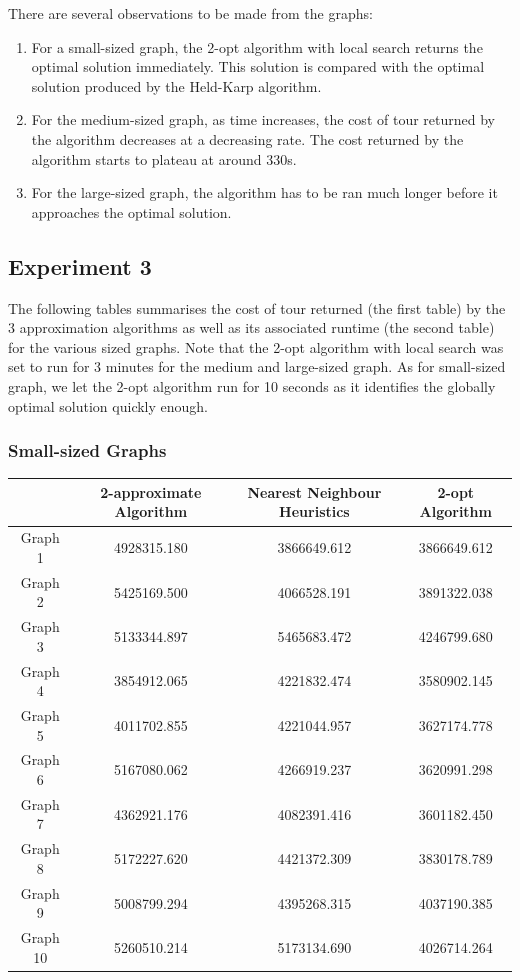\documentclass[paper=a4, fontsize=11pt]{scrartcl}	%
\numberwithin{equation}{section}		%
\numberwithin{figure}{section}			%
\numberwithin{table}{section}				%
\begin{document}
\begin{center}
\end{center}

There are several observations to be made from the graphs:
\begin{enumerate}
\item For a small-sized graph, the 2-opt algorithm with local search returns the optimal solution immediately. This solution is compared with the optimal solution produced by the Held-Karp algorithm.
\item For the medium-sized graph, as time increases, the cost of tour returned by the algorithm decreases at a decreasing rate. The cost returned by the algorithm starts to plateau at around 330s.
\item For the large-sized graph, the algorithm has to be ran much longer before it approaches the optimal solution.
\end{enumerate}
\subsection{Experiment 3}
The following tables summarises the cost of tour returned (the first table) by the 3 approximation algorithms as well as its associated runtime (the second table) for the various sized graphs. Note that the 2-opt algorithm with local search was set to run for 3 minutes for the medium and large-sized graph. As for small-sized graph, we let the 2-opt algorithm run for 10 seconds as it identifies the globally optimal solution quickly enough.

\subsubsection{Small-sized Graphs}

\begin{center}

\begin{tabular}{|c|c|c|c|}
\hline 
 & 2-approximate Algorithm & Nearest Neighbour Heuristics & 2-opt Algorithm \\ 
\hline 
Graph 1 & 4928315.180 & 3866649.612 & 3866649.612 \\ 
\hline 
Graph 2 & 5425169.500 & 4066528.191 & 3891322.038 \\ 
\hline 
Graph 3 & 5133344.897 & 5465683.472 & 4246799.680 \\ 
\hline 
Graph 4 & 3854912.065 & 4221832.474 & 3580902.145 \\ 
\hline 
Graph 5 & 4011702.855 & 4221044.957 & 3627174.778 \\ 
\hline 
Graph 6 & 5167080.062 & 4266919.237 & 3620991.298 \\ 
\hline 
Graph 7 & 4362921.176 & 4082391.416 & 3601182.450 \\ 
\hline 
Graph 8 & 5172227.620 & 4421372.309 & 3830178.789 \\ 
\hline 
Graph 9 & 5008799.294 & 4395268.315 & 4037190.385 \\ 
\hline 
Graph 10 & 5260510.214 & 5173134.690 & 4026714.264 \\ 
\hline 
\end{tabular} 
\end{center}
\end{document}
